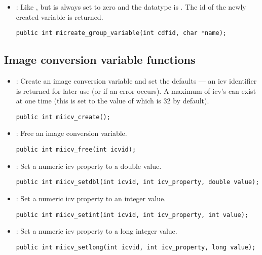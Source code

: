 \begin{itemize}
\item {} : Like
, but  is always set to zero
and the datatype is . The id of the newly created
variable is returned.
\begin{verbatim}
public int micreate_group_variable(int cdfid, char *name);
\end{verbatim}

\end{itemize}

\subsection{Image conversion variable functions}

\begin{itemize}

\item {} : Create an image conversion variable and
set the defaults --- an icv identifier is returned for later use (or
 if an error occurs). A maximum of
 icv's can exist at one time (this is set to 
the value of  which is 32 by default).
\begin{verbatim}
public int miicv_create();
\end{verbatim}

\item {} : Free an image conversion variable.
\begin{verbatim}
public int miicv_free(int icvid);
\end{verbatim}

\item {} : Set a numeric icv property to a double value.
\begin{verbatim}
public int miicv_setdbl(int icvid, int icv_property, double value);
\end{verbatim}

\item {} : Set a numeric icv property to an integer value.
\begin{verbatim}
public int miicv_setint(int icvid, int icv_property, int value);
\end{verbatim}

\item {} : Set a numeric icv property to a long
integer value.
\begin{verbatim}
public int miicv_setlong(int icvid, int icv_property, long value);
\end{verbatim}


\end{itemize}
